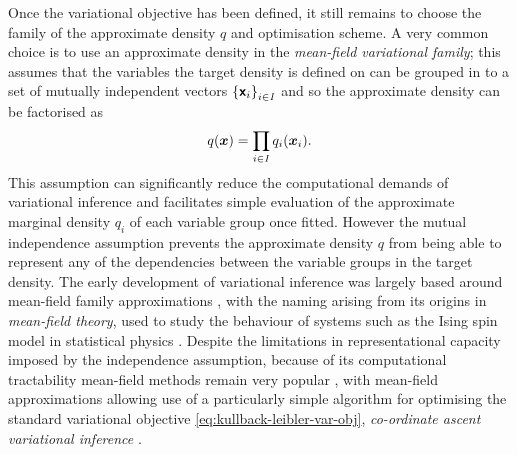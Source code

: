 Once the variational objective has been defined, it still remains to choose the family of the approximate density $q$ and optimisation scheme. 
A very common choice is to use an approximate density in the \emph{mean-field variational family}; this assumes that the variables the target density is defined on can be grouped in to a set of mutually independent vectors $\fset{\rvct{x}_i}_{i\in\set{I}}$ and so the approximate density can be factorised as
\begin{equation}\label{eq:mean-field-variational-family}
  q(\boldsymbol{x}) = \prod_{i\in\mathit{I}} q_i(\boldsymbol{x}_i).
\end{equation}
This assumption can significantly reduce the computational demands of variational inference and facilitates simple evaluation of the approximate marginal density $q_{i}$ of each variable group once fitted. However the mutual independence assumption prevents the approximate density $q$ from being able to represent any of the dependencies between the variable groups in the target density. The early development of variational inference was largely based around mean-field family approximations \citep{peterson1987mean,saul1996mean}, with the naming arising from its origins in \emph{mean-field theory}, used to study the behaviour of systems such as the Ising spin model in statistical physics \citep{parisi1998statistical}. Despite the limitations in representational capacity imposed by the independence assumption, because of its computational tractability mean-field methods remain very popular \citep{blei2017variational}, with mean-field approximations allowing use of a particularly simple algorithm for optimising the standard variational objective \eqref{eq:kullback-leibler-var-obj}, \emph{co-ordinate ascent variational inference} \citep{bishop2006pattern,blei2017variational}.

